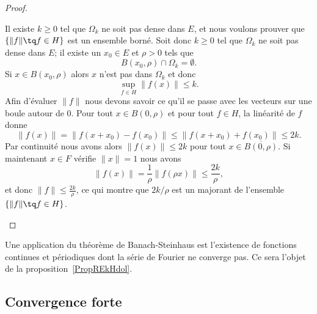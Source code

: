 \begin{proof}
\begin{subproof}
            Il existe \( k\geq 0\) tel que \( \Omega_k\) ne soit pas dense dans \( E\), et nous voulons prouver que \( \{ \| f \|\tq f\in H \}\) est un ensemble borné. Soit donc \( k\geq 0\) tel que \( \Omega_k\) ne soit pas dense dans \( E\); il existe un \( x_0\in E\) et \( \rho>0\) tels que
            \begin{equation}
                B(x_0,\rho)\cap \Omega_k=\emptyset.
            \end{equation}
            Si \( x\in B(x_0,\rho)\) alors \( x\) n'est pas dans \( \Omega_k\) et donc
            \begin{equation}
                \sup_{f\in H}\| f(x) \|\leq k.
            \end{equation}
            Afin d'évaluer \( \| f \|\) nous devons savoir ce qu'il se passe avec les vecteurs sur une boule autour de \( 0\). Pour tout \( x\in B(0,\rho)\) et pour tout \( f\in H\), la linéarité de \( f\) donne
            \begin{equation}
                \| f(x) \|=\| f(x+x_0)-f(x_0) \|\leq \| f(x+x_0)+f(x_0) \|\leq 2k.
            \end{equation}
            Par continuité nous avons alors \( \| f(x) \|\leq 2k\) pour tout \( x\in \overline{ B(0,\rho) }\). Si maintenant \( x\in F\) vérifie \( \| x \|=1\) nous avons
            \begin{equation}
                \| f(x) \|=\frac{1}{ \rho }\| f(\rho x) \|\leq \frac{ 2k }{ \rho },
            \end{equation}
            et donc \( \| f \|\leq \frac{ 2k }{ \rho }\), ce qui montre que \( 2k/\rho\) est un majorant de l'ensemble \( \{ \| f \|\tq f\in H \}\).

    \end{subproof}

\end{proof}
Une application du théorème de Banach-Steinhaus est l'existence de fonctions continues et périodiques dont la série de Fourier ne converge pas. Ce sera l'objet de la proposition~\ref{PropREkHdol}.

\subsection{Convergence forte}

